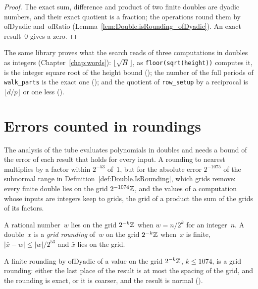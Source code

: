 \begin{proof}
  \leanok
  The exact sum, difference and product of two finite doubles are dyadic numbers, and their exact
  quotient is a fraction; the operations round them by $\mathrm{ofDyadic}$ and~$\mathrm{ofRatio}$
  (Lemma~\ref{lem:Double.isRounding_ofDyadic}). An exact result~$0$ gives a zero.
\end{proof}

The same library proves what the search reads of three computations in doubles as integers
(Chapter~\ref{chap:words}): $\lfloor\sqrt{H}\rfloor$, as \texttt{floor(sqrt(height))} computes it,
is the integer square root of the height bound
(); the number of the full periods of
\texttt{walk\_parts} is the exact one
(); and the quotient of
\texttt{row\_setup} by a reciprocal is $\lfloor d/p \rfloor$ or one less
().

\section{Errors counted in roundings}\label{sec:approx}

The analysis of the tube evaluates polynomials in doubles and needs a bound of the error of each
result that holds for every input. A rounding to nearest multiplies by a factor within $2^{-53}$
of~$1$, but for the absolute error $2^{-1075}$ of the subnormal range in
Definition~\ref{def:Double.IsRounding}, which grids remove: every finite double lies on the grid
$2^{-1074}\mathbb{Z}$, and the values of a computation whose inputs are integers keep to grids, the grid of
a product the sum of the grids of its factors.

\begin{definition}\label{def:OnGrid}
  \leanok
  A rational number~$w$ lies on the grid $2^{-k}\mathbb{Z}$ when $w = n/2^k$ for an integer~$n$. A
  double~$x$ is a \emph{grid rounding} of~$w$ on the grid $2^{-k}\mathbb{Z}$ when~$x$ is finite,
  $|\bar x - w| \le |w|/2^{53}$ and $\bar x$ lies on the grid.
\end{definition}

A finite rounding by $\mathrm{ofDyadic}$ of a value on the grid $2^{-k}\mathbb{Z}$, $k \le 1074$, is a grid
rounding: either the last place of the result is at most the spacing of the grid, and the rounding
is exact, or it is coarser, and the result is normal
().

